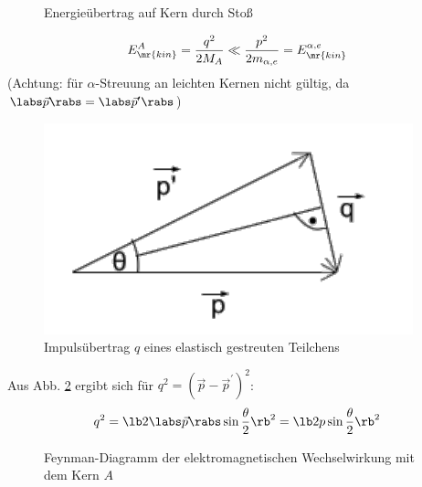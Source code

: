 \begin{itemize}
\begin{figure}[!ht]
	\caption{Energieübertrag auf Kern durch Stoß\label{fig:4.1}}
\end{figure}
\begin{align}
E^A_\mr{kin}=\frac{q^2}{2M_A} \ll \frac{p^2}{2m_{\alpha,e}}=E^{\alpha,e}_\mr{kin}
\end{align}
(Achtung: für $\alpha$-Streuung an leichten Kernen nicht gültig, da $\labs\vec{p}\rabs = \labs \vec{p}^\prime\rabs$)\\
\begin{figure}[!ht]
	\centering
	\includegraphics[width=.35\textwidth]{imgs/ep5-fig-4-2.pdf}
	\caption{Impulsübertrag $q$ eines elastisch gestreuten Teilchens \label{fig:4.2}}
	\end{figure}
Aus Abb. \ref{fig:4.2} ergibt sich für $q^2= (\vec p - \vec{p}^\prime)^2$:
\begin{align}
q^2=\lb 2\labs \vec{p}\rabs \sin\frac{\theta}{2}\rb ^2 = \lb  2 p \sin \frac{\theta}{2}\rb ^2
\end{align}
\begin{figure}[!ht]
	\centering
	\caption{Feynman-Diagramm der elektromagnetischen Wechselwirkung mit dem Kern $A$\label{fig:4.3}}
	\end{figure}
    

\end{itemize}
